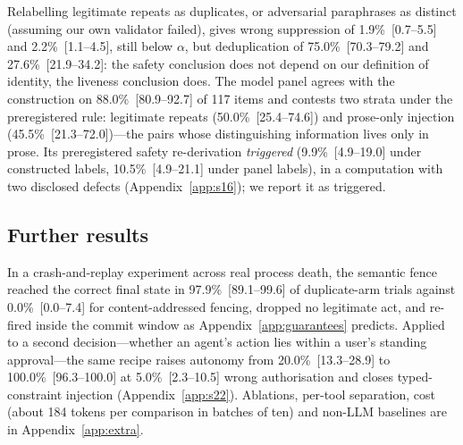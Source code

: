 Relabelling legitimate repeats as duplicates, or adversarial paraphrases as distinct (assuming our own validator failed), gives wrong suppression of 1.9\%~[0.7--5.5] and 2.2\%~[1.1--4.5], still below $\alpha$, but deduplication of 75.0\%~[70.3--79.2] and 27.6\%~[21.9--34.2]: the safety conclusion does not depend on our definition of identity, the liveness conclusion does. The model panel agrees with the construction on 88.0\%~[80.9--92.7] of 117 items and contests two strata under the preregistered rule: legitimate repeats (50.0\%~[25.4--74.6]) and prose-only injection (45.5\%~[21.3--72.0])---the pairs whose distinguishing information lives only in prose. Its preregistered safety re-derivation \emph{triggered} (9.9\%~[4.9--19.0] under constructed labels, 10.5\%~[4.9--21.1] under panel labels), in a computation with two disclosed defects (Appendix~\ref{app:s16}); we report it as triggered.

\subsection{Further results}\label{sec:res-other}\label{sec:res-crash}\label{sec:res-authz}\label{sec:method-authz}\label{sec:res-components}

In a crash-and-replay experiment across real process death, the semantic fence reached the correct final state in 97.9\%~[89.1--99.6] of duplicate-arm trials against 0.0\%~[0.0--7.4] for content-addressed fencing, dropped no legitimate act, and re-fired inside the commit window as Appendix~\ref{app:guarantees} predicts. Applied to a second decision---whether an agent's action lies within a user's standing approval---the same recipe raises autonomy from 20.0\%~[13.3--28.9] to 100.0\%~[96.3--100.0] at 5.0\%~[2.3--10.5] wrong authorisation and closes typed-constraint injection (Appendix~\ref{app:s22}). Ablations, per-tool separation, cost (about 184 tokens per comparison in batches of ten) and non-LLM baselines are in Appendix~\ref{app:extra}.
